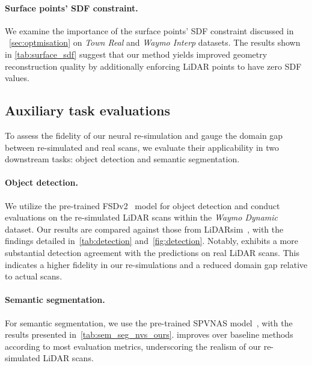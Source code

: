 \paragraph{Surface points' SDF constraint.}
We examine the importance of the surface points' SDF constraint discussed in ~\cref{sec:optmisation} on \textit{Town Real} and \textit{Waymo Interp} datasets. The results shown in \cref{tab:surface_sdf} suggest that our method yields improved geometry reconstruction quality by additionally enforcing LiDAR points to have zero SDF values. 


\subsection{Auxiliary task evaluations} 
\label{sec:downstream}
To assess the fidelity of our neural re-simulation and gauge the domain gap between re-simulated and real scans, we evaluate their applicability in two downstream tasks: object detection and semantic segmentation.


\paragraph{Object detection.}
We utilize the pre-trained FSDv2~\cite{fan2023fsdv2} model for object detection and conduct evaluations on the re-simulated LiDAR scans within the \textit{Waymo Dynamic} dataset. Our results are compared against those from LiDARsim~\cite{manivasagam2020lidarsim}, with the findings detailed in~\cref{tab:detection} and~\cref{fig:detection}. Notably, \dynfl exhibits a more substantial detection agreement with the predictions on real LiDAR scans. This indicates a higher fidelity in our re-simulations and a reduced domain gap relative to actual scans.




\paragraph{Semantic segmentation.}
For semantic segmentation, we use the pre-trained SPVNAS model~\cite{tang2020searching}, with the results presented in~\cref{tab:sem_seg_nvs_ours}. \dynfl improves over baseline methods according to most evaluation metrics, underscoring the realism of our re-simulated LiDAR scans.

